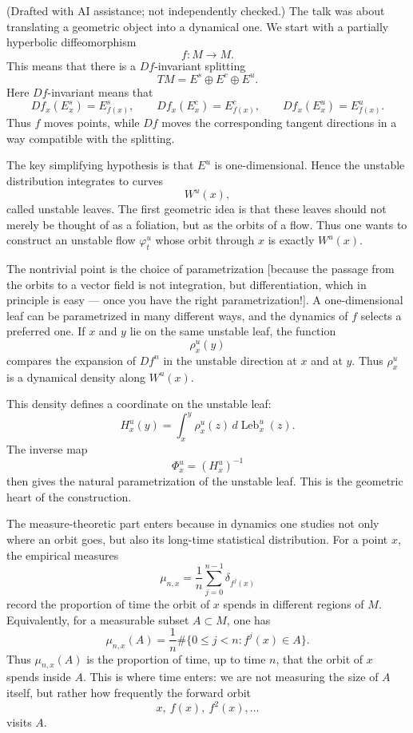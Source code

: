 \begin{remark}[Overview]
\label{remark-ai-overview-seminar-unstable-flow}
(Drafted with AI assistance; not
independently checked.)
The talk was about translating a geometric
object into a dynamical one. We start with a
partially hyperbolic diffeomorphism
$$
f:M\to M.
$$
This means that there is a $Df$-invariant
splitting
$$
TM=E^s\oplus E^c\oplus E^u.
$$
Here $Df$-invariant means that
$$
Df_x(E_x^s)=E_{f(x)}^s,\qquad
Df_x(E_x^c)=E_{f(x)}^c,\qquad
Df_x(E_x^u)=E_{f(x)}^u.
$$
Thus $f$ moves points, while $Df$ moves the
corresponding tangent directions in a way
compatible with the splitting.

\medskip\noindent
The key simplifying hypothesis is that
$E^u$ is one-dimensional. Hence the unstable
distribution integrates to curves
$$
W^u(x),
$$
called unstable leaves. The first geometric
idea is that these leaves should not merely
be thought of as a foliation, but as the
orbits of a flow. Thus one wants to construct
an unstable flow $\varphi_t^u$ whose orbit
through $x$ is exactly $W^u(x)$.

\medskip\noindent
The nontrivial point is the choice of
parametrization
[because the passage from the orbits
to a vector field is not integration,
but differentiation, which in principle
is easy --- once you have
the right parametrization!]. 
A one-dimensional leaf can
be parametrized in many different ways, and
the dynamics of $f$ selects a preferred one.
If $x$ and $y$ lie on the same unstable leaf,
the function
$$
\rho_x^u(y)
$$
compares the expansion of $Df^n$ in the
unstable direction at $x$ and at $y$. Thus
$\rho_x^u$ is a dynamical density along
$W^u(x)$.

\medskip\noindent
This density defines a coordinate on the
unstable leaf:
$$
H_x^u(y)
=
\int_x^y
\rho_x^u(z)\,d\operatorname{Leb}_x^u(z).
$$
The inverse map
$$
\Phi_x^u=(H_x^u)^{-1}
$$
then gives the natural parametrization of the
unstable leaf. This is the geometric heart of
the construction.

\medskip\noindent
The measure-theoretic part enters because in
dynamics one studies not only where an orbit
goes, but also its long-time statistical
distribution. For a point $x$, the empirical
measures
$$
\mu_{n,x}
=
\frac{1}{n}
\sum_{j=0}^{n-1}
\delta_{f^j(x)}
$$
record the proportion of time the orbit of
$x$ spends in different regions of $M$.
Equivalently, for a measurable subset
$A\subset M$, one has
$$
\mu_{n,x}(A)
=
\frac{1}{n}
\#\{0\leq j<n:f^j(x)\in A\}.
$$
Thus $\mu_{n,x}(A)$ is the proportion of
time, up to time $n$, that the orbit of $x$
spends inside $A$. This is where time enters:
we are not measuring the size of $A$ itself,
but rather how frequently the forward orbit
$$
x,\ f(x),\ f^2(x),\ldots
$$
visits $A$.


\end{remark}
